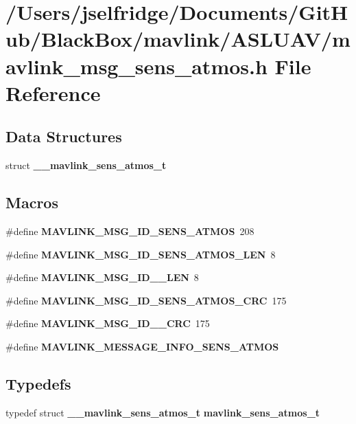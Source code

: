 \section{/\+Users/jselfridge/\+Documents/\+Git\+Hub/\+Black\+Box/mavlink/\+A\+S\+L\+U\+A\+V/mavlink\+\_\+msg\+\_\+sens\+\_\+atmos.h File Reference}
\label{mavlink__msg__sens__atmos_8h}
\subsection*{Data Structures}
\begin{DoxyCompactItemize}
\item 
struct \textbf{ \+\_\+\+\_\+mavlink\+\_\+sens\+\_\+atmos\+\_\+t}
\end{DoxyCompactItemize}
\subsection*{Macros}
\begin{DoxyCompactItemize}
\item 
\#define \textbf{ M\+A\+V\+L\+I\+N\+K\+\_\+\+M\+S\+G\+\_\+\+I\+D\+\_\+\+S\+E\+N\+S\+\_\+\+A\+T\+M\+OS}~208
\item 
\#define \textbf{ M\+A\+V\+L\+I\+N\+K\+\_\+\+M\+S\+G\+\_\+\+I\+D\+\_\+\+S\+E\+N\+S\+\_\+\+A\+T\+M\+O\+S\+\_\+\+L\+EN}~8
\item 
\#define \textbf{ M\+A\+V\+L\+I\+N\+K\+\_\+\+M\+S\+G\+\_\+\+I\+D\+\_\+\_\+\+L\+EN}~8
\item 
\#define \textbf{ M\+A\+V\+L\+I\+N\+K\+\_\+\+M\+S\+G\+\_\+\+I\+D\+\_\+\+S\+E\+N\+S\+\_\+\+A\+T\+M\+O\+S\+\_\+\+C\+RC}~175
\item 
\#define \textbf{ M\+A\+V\+L\+I\+N\+K\+\_\+\+M\+S\+G\+\_\+\+I\+D\+\_\+\_\+\+C\+RC}~175
\item 
\#define \textbf{ M\+A\+V\+L\+I\+N\+K\+\_\+\+M\+E\+S\+S\+A\+G\+E\+\_\+\+I\+N\+F\+O\+\_\+\+S\+E\+N\+S\+\_\+\+A\+T\+M\+OS}
\end{DoxyCompactItemize}
\subsection*{Typedefs}
\begin{DoxyCompactItemize}
\item 
typedef struct \textbf{ \+\_\+\+\_\+mavlink\+\_\+sens\+\_\+atmos\+\_\+t} \textbf{ mavlink\+\_\+sens\+\_\+atmos\+\_\+t}
\end{DoxyCompactItemize}



